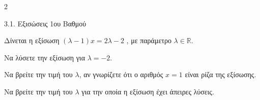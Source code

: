 \begin{ylh}{2}
    \item 3.1. Εξισώσεις 1ου Βαθμού
\end{ylh}
Δίνεται η εξίσωση $(\lambda - 1) x = 2\lambda - 2$ , με παράμετρο $\lambda \in \mathbb{R}$.
\begin{alist}
\item
\begin{rlist}
\item Να λύσετε την εξίσωση για $\lambda = -2$.
\item Να βρείτε την τιμή του $\lambda$, αν γνωρίζετε ότι ο αριθμός $x = 1$ είναι ρίζα της εξίσωσης.
\end{rlist}
\item Να βρείτε την τιμή του $\lambda$ για την οποία η εξίσωση έχει άπειρες λύσεις.
\end{alist}

